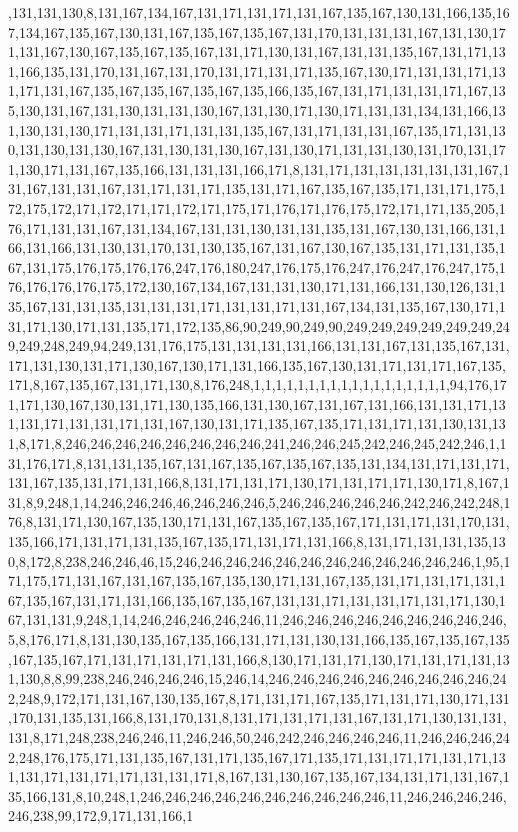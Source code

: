 ,131,131,130,8,131,167,134,167,131,171,131,171,131,167,135,167,130,131,166,135,167,134,167,135,167,130,131,167,135,167,135,167,131,170,131,131,131,167,131,130,171,131,167,130,167,135,167,135,167,131,171,130,131,167,131,131,135,167,131,171,131,166,135,131,170,131,167,131,170,131,171,131,171,135,167,130,171,131,131,171,131,171,131,167,135,167,135,167,135,167,135,166,135,167,131,171,131,131,171,167,135,130,131,167,131,130,131,131,130,167,131,130,171,130,171,131,131,134,131,166,131,130,131,130,171,131,131,171,131,131,135,167,131,171,131,131,167,135,171,131,130,131,130,131,130,167,131,130,131,130,167,131,130,171,131,131,130,131,170,131,171,130,171,131,167,135,166,131,131,131,166,171,8,131,171,131,131,131,131,131,167,131,167,131,131,167,131,171,131,171,135,131,171,167,135,167,135,171,131,171,175,172,175,172,171,172,171,171,172,171,175,171,176,171,176,175,172,171,171,135,205,176,171,131,131,167,131,134,167,131,131,130,131,131,135,131,167,130,131,166,131,166,131,166,131,130,131,170,131,130,135,167,131,167,130,167,135,131,171,131,135,167,131,175,176,175,176,176,247,176,180,247,176,175,176,247,176,247,176,247,175,176,176,176,176,175,172,130,167,134,167,131,131,130,171,131,166,131,130,126,131,135,167,131,131,135,131,131,131,171,131,131,171,131,167,134,131,135,167,130,171,131,171,130,171,131,135,171,172,135,86,90,249,90,249,90,249,249,249,249,249,249,249,249,248,249,94,249,131,176,175,131,131,131,131,166,131,131,167,131,135,167,131,171,131,130,131,171,130,167,130,171,131,166,135,167,130,131,171,131,171,167,135,171,8,167,135,167,131,171,130,8,176,248,1,1,1,1,1,1,1,1,1,1,1,1,1,1,1,1,1,1,94,176,171,171,130,167,130,131,171,130,135,166,131,130,167,131,167,131,166,131,131,171,131,131,171,131,131,171,131,167,130,131,171,135,167,135,171,131,171,131,130,131,131,8,171,8,246,246,246,246,246,246,246,246,241,246,246,245,242,246,245,242,246,1,131,176,171,8,131,131,135,167,131,167,135,167,135,167,135,131,134,131,171,131,171,131,167,135,131,171,131,166,8,131,171,131,171,130,171,131,171,171,130,171,8,167,131,8,9,248,1,14,246,246,246,46,246,246,246,5,246,246,246,246,246,242,246,242,248,176,8,131,171,130,167,135,130,171,131,167,135,167,135,167,171,131,171,131,170,131,135,166,171,131,171,131,135,167,135,171,131,171,131,166,8,131,171,131,131,135,130,8,172,8,238,246,246,46,15,246,246,246,246,246,246,246,246,246,246,246,246,1,95,171,175,171,131,167,131,167,135,167,135,130,171,131,167,135,131,171,131,171,131,167,135,167,131,171,131,166,135,167,135,167,131,131,171,131,131,171,131,171,130,167,131,131,9,248,1,14,246,246,246,246,246,11,246,246,246,246,246,246,246,246,246,5,8,176,171,8,131,130,135,167,135,166,131,171,131,130,131,166,135,167,135,167,135,167,135,167,171,131,171,131,171,131,166,8,130,171,131,171,130,171,131,171,131,131,130,8,8,99,238,246,246,246,246,15,246,14,246,246,246,246,246,246,246,246,246,242,248,9,172,171,131,167,130,135,167,8,171,131,171,167,135,171,131,171,130,171,131,170,131,135,131,166,8,131,170,131,8,131,171,131,171,131,167,131,171,130,131,131,131,8,171,248,238,246,246,11,246,246,50,246,242,246,246,246,246,11,246,246,246,242,248,176,175,171,131,135,167,131,171,135,167,171,135,171,131,171,171,131,171,131,131,171,131,171,171,131,131,171,8,167,131,130,167,135,167,134,131,171,131,167,135,166,131,8,10,248,1,246,246,246,246,246,246,246,246,246,246,11,246,246,246,246,246,238,99,172,9,171,131,166,1